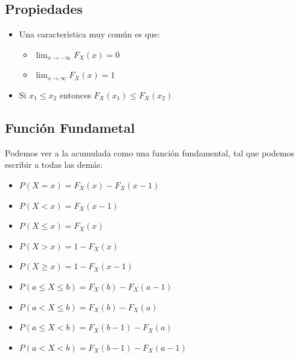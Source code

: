 \documentclass[12pt, fleqn]{report}                             %
\theoremstyle{break}                                            %
\begin{document}
            \subsection{Propiedades}

                \begin{itemize}
                    \item
                        Una característica muy común es que:
                        \begin{itemize}
                            \item $\lim_{x \to -\infty} F_X (x) = 0$
                            \item $\lim_{x \to \infty} F_X (x) = 1$
                        \end{itemize}
                    \item
                        Si $x_1 \leq x_2$ entonces $F_X(x_1) \leq F_X(x_2)$
                \end{itemize}



            \subsection{Función Fundametal}

                Podemos ver a la acumulada como una función fundamental, tal que
                podemos escribir a todas las demás:
                \begin{itemize}
                    \item $P(X = x)             = F_X(x) - F_X(x - 1)$
                    \item $P(X < x)             = F_X(x - 1)$
                    \item $P(X \leq x)          = F_X(x)$
                    \item $P(X > x)             = 1 - F_X(x)$
                    \item $P(X \geq x)          = 1 - F_X(x - 1)$
                    \item $P(a \leq X \leq b)   = F_X(b) - F_X(a - 1)$
                    \item $P(a < X \leq b)      = F_X(b) - F_X(a)$
                    \item $P(a \leq X < b)      = F_X(b - 1) - F_X(a)$
                    \item $P(a < X < b)         = F_X(b - 1) - F_X(a - 1)$
                \end{itemize}
                
\end{document}
